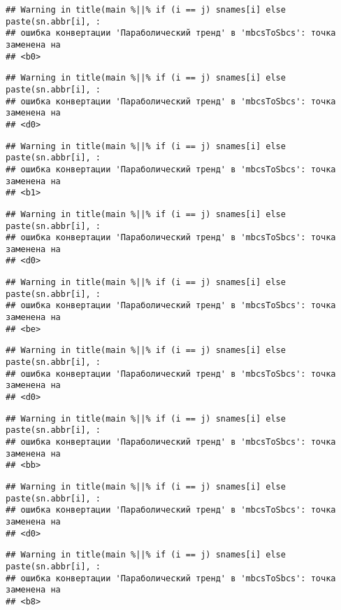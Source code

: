 \documentclass[
]{article}
\begin{document}
\begin{verbatim}
## Warning in title(main %||% if (i == j) snames[i] else paste(sn.abbr[i], :
## ошибка конвертации 'Параболический тренд' в 'mbcsToSbcs': точка заменена на
## <b0>
\end{verbatim}

\begin{verbatim}
## Warning in title(main %||% if (i == j) snames[i] else paste(sn.abbr[i], :
## ошибка конвертации 'Параболический тренд' в 'mbcsToSbcs': точка заменена на
## <d0>
\end{verbatim}

\begin{verbatim}
## Warning in title(main %||% if (i == j) snames[i] else paste(sn.abbr[i], :
## ошибка конвертации 'Параболический тренд' в 'mbcsToSbcs': точка заменена на
## <b1>
\end{verbatim}

\begin{verbatim}
## Warning in title(main %||% if (i == j) snames[i] else paste(sn.abbr[i], :
## ошибка конвертации 'Параболический тренд' в 'mbcsToSbcs': точка заменена на
## <d0>
\end{verbatim}

\begin{verbatim}
## Warning in title(main %||% if (i == j) snames[i] else paste(sn.abbr[i], :
## ошибка конвертации 'Параболический тренд' в 'mbcsToSbcs': точка заменена на
## <be>
\end{verbatim}

\begin{verbatim}
## Warning in title(main %||% if (i == j) snames[i] else paste(sn.abbr[i], :
## ошибка конвертации 'Параболический тренд' в 'mbcsToSbcs': точка заменена на
## <d0>
\end{verbatim}

\begin{verbatim}
## Warning in title(main %||% if (i == j) snames[i] else paste(sn.abbr[i], :
## ошибка конвертации 'Параболический тренд' в 'mbcsToSbcs': точка заменена на
## <bb>
\end{verbatim}

\begin{verbatim}
## Warning in title(main %||% if (i == j) snames[i] else paste(sn.abbr[i], :
## ошибка конвертации 'Параболический тренд' в 'mbcsToSbcs': точка заменена на
## <d0>
\end{verbatim}

\begin{verbatim}
## Warning in title(main %||% if (i == j) snames[i] else paste(sn.abbr[i], :
## ошибка конвертации 'Параболический тренд' в 'mbcsToSbcs': точка заменена на
## <b8>
\end{verbatim}
\end{document}
